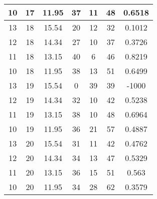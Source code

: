 \documentclass[letterpaper, 12pt]{article}
\begin{document}
\begin{longtable}{|c|c|c|c|c|c|c|}
10 & 17 & 11.95 & 37 & 11 & 48 & 0.6518 \\
\hline
13 & 18 & 15.54 & 20 & 12 & 32 & 0.1012 \\
\hline
12 & 18 & 14.34 & 27 & 10 & 37 & 0.3726 \\
\hline
11 & 18 & 13.15 & 40 & 6 & 46 & 0.8219 \\
\hline
10 & 18 & 11.95 & 38 & 13 & 51 & 0.6499 \\
\hline
13 & 19 & 15.54 & 0 & 39 & 39 & -1000 \\
\hline
12 & 19 & 14.34 & 32 & 10 & 42 & 0.5238 \\
\hline
11 & 19 & 13.15 & 38 & 10 & 48 & 0.6964 \\
\hline
10 & 19 & 11.95 & 36 & 21 & 57 & 0.4887 \\
\hline
13 & 20 & 15.54 & 31 & 11 & 42 & 0.4762 \\
\hline
12 & 20 & 14.34 & 34 & 13 & 47 & 0.5329 \\
\hline
11 & 20 & 13.15 & 36 & 15 & 51 & 0.563 \\
\hline
10 & 20 & 11.95 & 34 & 28 & 62 & 0.3579 \\
\hline
\end{longtable}
\end{document}
